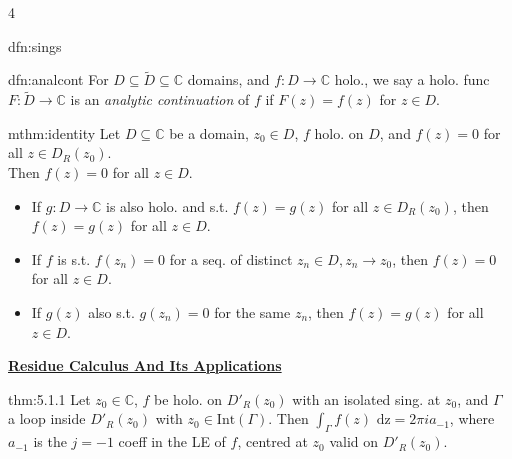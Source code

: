 \documentclass[landscape, 8pt]{extarticle}
\begin{document}
\begin{multicols*}{4}
\begin{dfn}[Singularities]{dfn:sings}{ }
		\end{dfn}
		
		
		\begin{dfn}{dfn:analcont}{ }
			For $D \subseteq \tilde{D} \subseteq \mathbb{C}$ domains, and $f: D \to \mathbb{C}$ holo., we say a holo. func $F: \tilde{D} \to \mathbb{C}$ is an \textit{analytic continuation} of $f$ if $F(z) = f(z)$ for $z \in D$.
			
			
		\end{dfn}
		
		
		\begin{mthm}{mthm:identity}{ }
			Let $D \subseteq \mathbb{C}$ be a domain, $z_0 \in D$, $f$ holo. on $D$, and $f(z) = 0$ for all $z \in D_R(z_0)$. \\
			Then $f(z) = 0$ for all $z \in D$.
			\begin{itemize}
				\item If $g : D \to \mathbb{C}$ is also holo. and s.t. $f(z) = g(z)$ for all $z \in D_R(z_0)$, then $f(z) = g(z)$ for all $z \in D$.
				\item If $f$ is s.t. $f(z_n) = 0$ for a seq. of distinct $z_n \in D, z_n \to z_0$, then $f(z) = 0$ for all $z \in D$.
				\item If $g(z)$ also s.t. $g(z_n) = 0$ for the same $z_n$, then $f(z) = g(z)$ for all $z \in D$.
			\end{itemize}
			
			
		\end{mthm}
		
		
		
		
		
	{\footnotesize \textbf{\underline{Residue Calculus And Its Applications}}}
		
		
		\begin{thm}[5.1.1]{thm:5.1.1}{}
			Let $z_0 \in \mathbb{C}$, $f$ be holo. on $D'_R(z_0)$ with an isolated sing. at $z_0$, and $\Gamma$ a loop inside $D'_R(z_0)$ with $z_0 \in \text{Int}(\Gamma)$.
			Then $\int_{\Gamma} f(z) \text{ dz} = 2 \pi i a_{-1}$, where $a_{-1}$ is the $j= -1$ coeff in the LE of $f$, centred at $z_0$ valid on $D'_R(z_0)$.
			
			
			
		\end{thm}
		

\end{multicols*}
\end{document}
